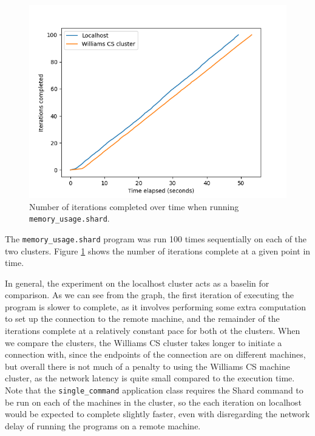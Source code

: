 \documentclass[twoside]{report}
\begin{document}
\begin{figure}[h]
  \begin{center}
    \includegraphics[scale=0.9]{img/experiments/e1_1620966966721.png}
    \caption{Number of iterations completed over time when running \texttt{memory\_usage.shard}.}
    \label{fig:memoryusage}
  \end{center}
\end{figure}

The \texttt{memory\_usage.shard} program was run 100 times sequentially on each of the two clusters.
Figure \ref{fig:memoryusage} shows the number of iterations complete at a given point in time.

In general, the experiment on the localhost cluster acts as a baselin for comparison.
As we can see from the graph, the first iteration of executing the program is slower to complete, as it involves performing some extra computation to set up the connection to the remote machine, and the remainder of the iterations complete at a relatively constant pace for both ot the clusters.
When we compare the clusters, the Williams CS cluster takes longer to initiate a connection with, since the endpoints of the connection are on different machines, but overall there is not much of a penalty to using the Williams CS machine cluster, as the network latency is quite small compared to the execution time.
Note that the \texttt{single\_command} application class requires the Shard command to be run on each of the machines in the cluster, so the each iteration on localhost would be expected to complete slightly faster, even with disregarding the network delay of running the programs on a remote machine.
\end{document}
